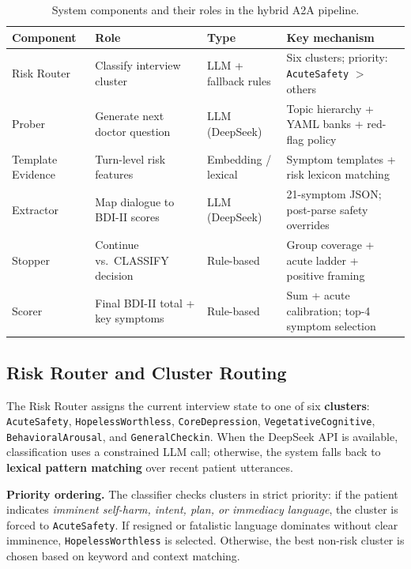 \documentclass[]{ceurart}
\begin{document}
\begin{table}[t]
\caption{System components and their roles in the hybrid A2A pipeline.}
\label{tab:components}
\centering
\small
\begin{tabular}{llll}
\toprule
\textbf{Component} & \textbf{Role} & \textbf{Type} & \textbf{Key mechanism} \\
\midrule
Risk Router      & Classify interview cluster      & LLM + fallback rules & Six clusters; priority: \texttt{AcuteSafety} $>$ others \\
Prober           & Generate next doctor question    & LLM (DeepSeek)       & Topic hierarchy + YAML banks + red-flag policy \\
Template Evidence& Turn-level risk features         & Embedding / lexical  & Symptom templates + risk lexicon matching \\
Extractor        & Map dialogue to BDI-II scores    & LLM (DeepSeek)       & 21-symptom JSON; post-parse safety overrides \\
Stopper          & Continue vs.\ CLASSIFY decision  & Rule-based           & Group coverage + acute ladder + positive framing \\
Scorer           & Final BDI-II total + key symptoms& Rule-based           & Sum + acute calibration; top-4 symptom selection \\
\bottomrule
\end{tabular}
\end{table}

\subsection{Risk Router and Cluster Routing}\label{sec:router}

The Risk Router assigns the current interview state to one of six \textbf{clusters}: \texttt{AcuteSafety}, \texttt{HopelessWorthless}, \texttt{CoreDepression}, \texttt{VegetativeCognitive}, \texttt{BehavioralArousal}, and \texttt{GeneralCheckin}.
When the DeepSeek API is available, classification uses a constrained LLM call; otherwise, the system falls back to \textbf{lexical pattern matching} over recent patient utterances.

\textbf{Priority ordering.}
The classifier checks clusters in strict priority: if the patient indicates \emph{imminent self-harm, intent, plan, or immediacy language}, the cluster is forced to \texttt{AcuteSafety}.
If resigned or fatalistic language dominates without clear imminence, \texttt{HopelessWorthless} is selected.
Otherwise, the best non-risk cluster is chosen based on keyword and context matching.
\end{document}
